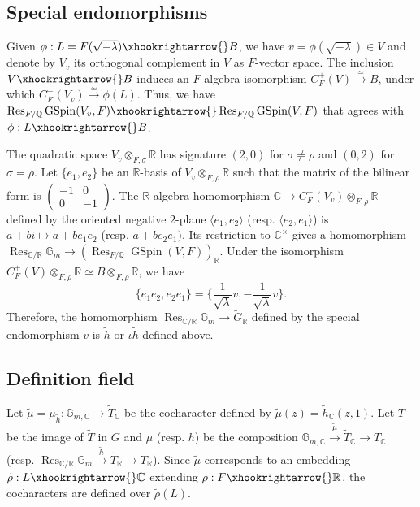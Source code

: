 \documentclass{amsart}
\numberwithin{equation}{subsection}
\numberwithin{theorem}{section}
\theoremstyle{definition}
\theoremstyle{remark}
\newcommand{\bC}{\mathbb{C}}
\newcommand{\bG}{\mathbb{G}}
\newcommand{\bQ}{\mathbb{Q}}
\newcommand{\bR}{\mathbb{R}}
\DeclareMathOperator{\GSpin}{GSpin}
\DeclareMathOperator{\Res}{Res}
\begin{document}
\subsection{Special endomorphisms} \label{sec:special_end}

Given $\phi: L = F(\sqrt{-\lambda})\xhookrightarrow{} B$, we have $v = \phi(\sqrt{-\lambda} )\in V$ and denote by $V_v$ its orthogonal complement in $V$ as $F$-vector space.  
The inclusion $V\xhookrightarrow{} B$ induces an $F$-algebra isomorphism $C^+_F(V) \xrightarrow{\simeq} B$, under which $C^+_F(V_v) \xrightarrow{\simeq } \phi(L)$. 
Thus, we have $\Res_{F/\bQ} \GSpin(V_v, F) \xhookrightarrow{} \Res_{F/\bQ} \GSpin(V, F)$ that agrees with $\phi: L\xhookrightarrow{}B$. 

    The quadratic space $V_v\otimes_{F,\sigma}\bR$ has signature $(2,0)$ for $\sigma\neq \rho$ and $(0,2)$ for $\sigma = \rho$. Let $\{e_1, e_2\}$ be an $\bR$-basis of $V_v\otimes_{F,\rho}\bR$ such that the matrix of the bilinear form is $\begin{pmatrix}
        -1 & 0 \\ 0 & -1
    \end{pmatrix}$. The $\bR$-algebra homomorphism $\bC \to C^+_F(V_v)\otimes_{F, \rho}\bR$ defined by the oriented negative $2$-plane $\langle e_1, e_2\rangle$ (resp. $\langle e_2, e_1\rangle$) is $a+bi \mapsto a+be_1e_2$ (resp. $a+be_2e_1)$. Its restriction to $\bC^\times$ gives a homomorphism $\Res_{\bC/\bR}\bG_m\to  (\Res_{F/\bQ} \GSpin(V, F))_{\bR} $. Under the isomorphism $C^+_F(V) \otimes_{F, \rho} \bR \simeq B\otimes_{F, \rho} \bR$, we have \begin{equation}\label{eq:special_end}\{e_1e_2, e_2e_1\} = \{\frac{1}{\sqrt{\lambda}} v, -\frac{1}{\sqrt{\lambda}} v\}.\end{equation} Therefore, the homomorphism $\Res_{\bC/\bR}\mathbb{G}_m \to \widetilde{G}_{\bR}$ defined by the special endomorphism $v$ is $\tilde{h}$ or $\iota \tilde{h}$ defined above. 

\subsection{Definition field}\label{sec:def_field}

Let $\tilde{\mu} = \mu_{\tilde{h}}: \bG_{m,\bC} \to \widetilde{T}_{\bC}$ be the cocharacter defined by $\tilde{\mu}(z) = \tilde{h}_{\bC}(z,1)$. Let $T$ be the image of  $\widetilde{T}$ in $G$ and $\mu$ (resp. $h$) be the composition $\bG_{m, \bC} \xrightarrow{\tilde{\mu}} \widetilde{T}_{\bC} \to T_{\bC}$ (resp. $\Res_{\bC/\bR} \bG_m \xrightarrow{\tilde{h}} \widetilde{T}_{\bR} \to T_{\bR}$). Since $\tilde{\mu}$ corresponds to an embedding $\tilde{\rho}: L\xhookrightarrow{} \bC$ extending $\rho: F\xhookrightarrow{}\bR$, the cocharacters are defined over $\tilde{\rho}(L)$.  
\end{document}

